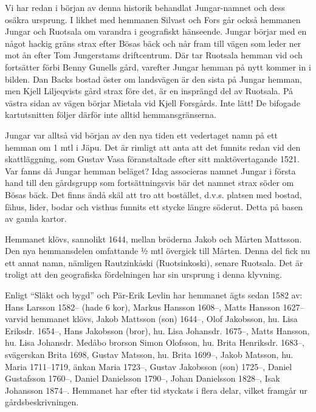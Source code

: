 %


Vi har redan i början av denna historik behandlat Jungar-namnet och dess osäkra ursprung.
I likhet med hemmanen Silvast och Fors går också hemmanen Jungar och Ruotsala om varandra i geografiskt hänseende. Jungar börjar med en något hackig gräns strax efter  Bösas bäck och når fram till vägen som leder ner mot ån efter Tom Jungerstams driftcentrum. Där tar Ruotsala hemman vid och fortsätter förbi Benny Gunells gård, varefter Jungar hemman på nytt kommer in i bilden. Dan Backs bostad öster om landsvägen är den sista på Jungar hemman, men Kjell Liljeqvists gård strax före det, är en  insprängd del av Ruotsala. På västra sidan av vägen börjar Mietala vid Kjell Forsgårds. Inte lätt! De bifogade kartutsnitten följer därför inte alltid hemmansgränserna.

Jungar var alltså vid början av den nya tiden ett vedertaget namn på ett hemman om 1 mtl i Jäpu. Det är rimligt att anta att det funnits redan vid den skattläggning, som Gustav Vasa föranstaltade efter sitt maktövertagande 1521. Var fanns då Jungar hemman beläget? Idag associeras namnet Jungar i första hand till den gårdsgrupp som fortsättningsvis bär det namnet strax söder om Bösas bäck. Det finns ändå skäl att tro att bostället, d.v.s. platsen med bostad, fähus, lider, bodar och visthus funnits ett stycke längre söderut. Detta på basen av gamla kartor.

Hemmanet klövs, sannolikt 1644, mellan bröderna Jakob och Mårten Mattsson. Den nya hemmansdelen omfattande ½ mtl övergick till Mårten. Denna del fick nu ett annat namn, nämligen Rautzinkåski (Ruotsinkoski), senare Ruotsala. Det är troligt att den geografiska fördelningen har sin ursprung i denna klyvning.

Enligt ``Släkt och bygd'' och Pär-Erik Levlin har hemmanet ägts sedan 1582 av:
Hans Larsson  1582-- (hade 6 kor), Markus Hansson 1608--, Matts Hansson 1627-- varvid hemmanet klövs, Jakob Mattsson (son) 1644--, Olof Jakobsson, hu. Lisa Eriksdr. 1654--, Hans Jakobsson (bror), hu. Lisa Johansdr. 1675--, Matts Hansson, hu. Lisa Johansdr. Medåbo brorson Simon Olofsson, hu. Brita Henriksdr. 1683--, svägerskan Brita 1698, Gustav Matsson, hu. Brita 1699--, Jakob Matsson, hu. Maria 1711--1719, änkan Maria 1723--, Gustav Jakobsson (son) 1725--, Daniel Gustafsson 1760--, Daniel Danielsson 1790--, Johan Danielsson 1828--, Isak Johansson 1874--. Hemmanet har efter tid styckats i flera delar, vilket framgår ur gårdsbeskrivningen.


